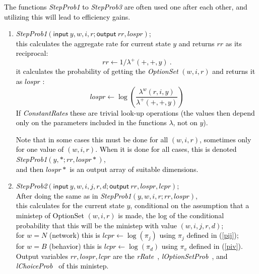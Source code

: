 \documentclass[a4paper,12pt,fleqn]{article}
\newcommand{\nnm}[1]{\textsf{\small\textit{#1}\ }}
\newcommand{\adda}[1]{{#1}}  %
\newcommand{\addaa}[1]{{\textcolor[named]{Black}{#1}}}  %
\begin{document}
\addaa{The functions \textit{StepProb1} to \textit{StepProb3}
are often used one after each other,
and utilizing this will lead to efficiency gains.}


\begin{enumerate}
\item \addaa{ \textit{StepProb1}$(\textsf{input}\ y, w,i,r; \textsf{output}\ rr, lospr)$;\\
      this calculates the aggregate rate for current state $y$
      and returns $rr$ as its reciprocal:
      \[
      rr \leftarrow 1/\lambda^+(+,+,y) \ .
      \]
      it calculates the probability of getting the \textit{OptionSet} $(w,i,r)$
      and returns it as $lospr$ :
      \[
      lospr \leftarrow    \log\left(\frac{\lambda^w(r,i,y)}{\lambda^+(+,+,y)}\right)
      \]
      If \textit{ConstantRates} these are trivial look-up operations
      (the values then depend only on the parameters included in the functions $\lambda$,
      not on $y$).}

      \addaa{Note that in some cases this must be done for all $(w,i,r)$, sometimes
      only for one value of $(w,i,r)$. When it is done for all cases,
      this is denoted\\
       \textit{StepProb1}$(y, *; rr, lospr*)$, \\
       and then $lospr*$
      is an output array of suitable dimensions.}
\item \addaa{\textit{StepProb2}$(\textsf{input}\ y, w,i,j,r,d; \textsf{output}\ rr, lospr, lcpr)$;\\
      After doing the same as in \textit{StepProb1}$(y, w, i, r; rr, lospr)$,\\
      this calculates for the current state $y$, conditional on the
      assumption that a ministep of \adda{OptionSet} $(w,i,r)$ is made,
      the log of the conditional probability that this will be the ministep
      with value $(w,i,j,r,d)$;\\
      for $w=N$ (network) this is $lcpr \leftarrow \log(\pi_j)$ using $\pi_j$ defined in (\ref{pij});\\
      for $w=B$ (behavior) this is $lcpr \leftarrow \log(\pi_d)$
      using $\pi_v$ defined in (\ref{piv}).\\
      Output variables $ rr, lospr, lcpr$ are the \nnm{rRate}, \nnm{lOptionSetProb}, and\\
      \nnm{lChoiceProb} of this ministep.}


\end{enumerate}
\end{document}
